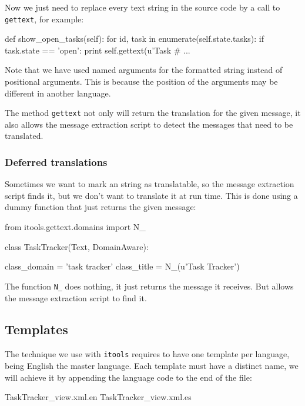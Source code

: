 Now we just need to replace every text string in the source code by a
call to {\tt gettext}, for example:

\begin{code}
    def show_open_tasks(self):
        for id, task in enumerate(self.state.tasks):
            if task.state == 'open':
                print self.gettext(u'Task #%
        ...
\end{code}

Note that we have used named arguments for the formatted string instead
of positional arguments. This is because the position of the arguments
may be different in another language.

The method {\tt gettext} not only will return the translation for the
given message, it also allows the message extraction script to detect
the messages that need to be translated.

\subsubsection{Deferred translations}

Sometimes we want to mark an string as translatable, so the message
extraction script finds it, but we don't want to translate it at run time.
This is done using a dummy function that just returns the given message:

\begin{code}
    from itools.gettext.domains import N_

    class TaskTracker(Text, DomainAware):

        class_domain = 'task tracker'
        class_title = N_(u'Task Tracker')
\end{code}

The function {\tt N\_} does nothing, it just returns the message it
receives. But allows the message extraction script to find it.


\subsection{Templates}


The technique we use with {\tt itools} requires to have one template per
language, being English the master language. Each template must have a
distinct name, we will achieve it by appending the language code to the
end of the file:

\begin{code}
    TaskTracker_view.xml.en
    TaskTracker_view.xml.es
\end{code}

